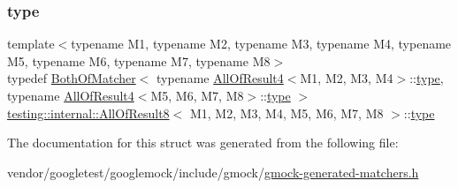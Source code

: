 \subsubsection{\texorpdfstring{type}{type}}
{\footnotesize\ttfamily template$<$typename M1, typename M2, typename M3, typename M4, typename M5, typename M6, typename M7, typename M8$>$ \\
typedef \hyperlink{classtesting_1_1internal_1_1_both_of_matcher}{Both\+Of\+Matcher}$<$ typename \hyperlink{structtesting_1_1internal_1_1_all_of_result4}{All\+Of\+Result4}$<$M1, M2, M3, M4$>$\+::\hyperlink{structtesting_1_1internal_1_1_all_of_result8_a7103892a28c35221b9e62e871c577727}{type}, typename \hyperlink{structtesting_1_1internal_1_1_all_of_result4}{All\+Of\+Result4}$<$M5, M6, M7, M8$>$\+::\hyperlink{structtesting_1_1internal_1_1_all_of_result8_a7103892a28c35221b9e62e871c577727}{type} $>$ \hyperlink{structtesting_1_1internal_1_1_all_of_result8}{testing\+::internal\+::\+All\+Of\+Result8}$<$ M1, M2, M3, M4, M5, M6, M7, M8 $>$\+::\hyperlink{structtesting_1_1internal_1_1_all_of_result8_a7103892a28c35221b9e62e871c577727}{type}}



The documentation for this struct was generated from the following file\+:\begin{DoxyCompactItemize}
\item 
vendor/googletest/googlemock/include/gmock/\hyperlink{gmock-generated-matchers_8h}{gmock-\/generated-\/matchers.\+h}\end{DoxyCompactItemize}
